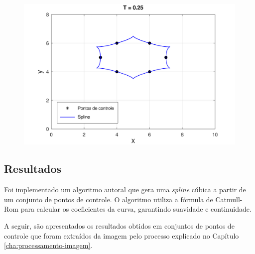 \begin{figure}[h!]
    \begin{minipage}[b]{0.45\textwidth}
        \centering
        \includegraphics[width=1\linewidth]{fig/cat_rom_t025.png}
        \label{fig:tensao025}
    \end{minipage}
    \label{fig:tensao}
\end{figure}

\subsection{Resultados}

Foi implementado um algoritmo autoral que gera uma \textit{spline} cúbica a partir de um conjunto de pontos de controle. O algoritmo utiliza a fórmula de Catmull-Rom para calcular os coeficientes da curva, garantindo suavidade e continuidade. 

A seguir, são apresentados os resultados obtidos em conjuntos de pontos de controle que foram extraídos da imagem pelo processo explicado no Capítulo \ref{cha:processamento-imagem}.


